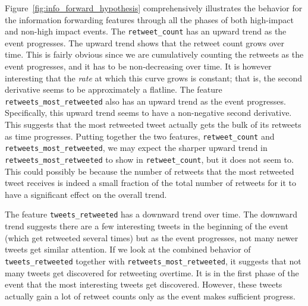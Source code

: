 \documentclass[10pt,letterpaper]{article}
\begin{document}
Figure~\ref{fig:info_forward_hypothesis} comprehensively illustrates
the behavior for the information forwarding features through all the
phases of both high-impact and non-high impact events. The
\texttt{retweet\_count} has an upward trend as the event progresses.
The upward trend shows that the retweet count grows over time. This is
fairly obvious since we are cumulatively counting the retweets as the
event progresses, and it has to be non-decreasing over time. It is
however interesting that the \emph{rate} at which this curve grows is
constant; that is, the second derivative seems to be approximately a
flatline. The feature \texttt{retweets\_most\_retweeted} also has an
upward trend as the event progresses. Specifically, this upward trend
seems to have a non-negative second derivative. This suggests that the
most retweeted tweet actually gets the bulk of its retweets as time
progresses. Putting together the two features, \texttt{retweet\_count}
and \texttt{retweets\_most\_retweeted}, we may expect the sharper
upward trend in \texttt{retweets\_most\_retweeted} to show in
\texttt{retweet\_count}, but it does not seem to. This could possibly
be because the number of retweets that the most retweeted tweet
receives is indeed a small fraction of the total number of retweets
for it to have a significant effect on the overall trend.

The feature \texttt{tweets\_retweeted} has a downward trend over time.
The downward trend suggests there are a few interesting tweets in the
beginning of the event (which get retweeted several times) but as the
event progresses, not many newer tweets get similar attention. If we
look at the combined behavior of \texttt{tweets\_retweeted} together
with \texttt{retweets\_most\_retweeted}, it suggests that not many
tweets get discovered for retweeting overtime. It is in the first
phase of the event that the most interesting tweets get discovered.
However, these tweets actually gain a lot of retweet counts only as
the event makes sufficient progress.
\end{document}
